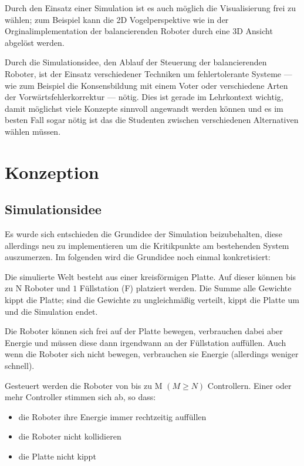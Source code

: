 Durch den Einsatz einer Simulation ist es auch m{\"{o}}glich die Visualisierung frei zu w{\"{a}}hlen; zum Beispiel kann die 2D
Vogelperspektive wie in der Orginalimplementation der balancierenden Roboter durch eine 3D Ansicht abgel{\"{o}}st werden.

Durch die Simulationsidee, den Ablauf der Steuerung der balancierenden Roboter, ist der Einsatz verschiedener Techniken um
fehlertolerante Systeme --- wie zum Beispiel die Konsensbildung mit einem Voter oder verschiedene Arten der Vorw{\"{a}}rtsfehlerkorrektur ---
n{\"{o}}tig. Dies ist gerade im Lehrkontext wichtig, damit m{\"{o}}glichst viele Konzepte sinnvoll angewandt werden
k{\"{o}}nnen und es im besten Fall sogar n{\"{o}}tig ist das die Studenten zwischen verschiedenen Alternativen w{\"{a}}hlen
m{\"{u}}ssen.

\clearpage
\section{Konzeption}
\subsection{Simulationsidee}
Es wurde sich entschieden die Grundidee der Simulation beizubehalten, diese allerdings neu zu implementieren um die Kritikpunkte am
bestehenden System auszumerzen. Im folgenden wird die Grundidee noch einmal konkretisiert:

Die simulierte Welt besteht aus einer kreisf{\"{o}}rmigen Platte. Auf dieser k{\"{o}}nnen bis zu \gls{N}
Roboter und $1$ F{\"{u}}llstation (\gls{F}) platziert werden. Die Summe alle Gewichte kippt die Platte;
sind die Gewichte zu ungleichm{\"{a}}{\ss}ig verteilt, kippt die Platte um und die Simulation endet.

Die Roboter k{\"{o}}nnen sich frei auf der Platte bewegen, verbrauchen dabei aber Energie und m{\"{u}}ssen diese dann irgendwann
an der F{\"{u}}llstation auff{\"{u}}llen. Auch wenn die Roboter sich nicht bewegen, verbrauchen sie Energie (allerdings weniger
schnell).

Gesteuert werden die Roboter von bis zu \gls{M} $(M \geq N)$ Controllern. Einer oder mehr Controller stimmen sich ab,
so dass:
\begin{itemize}
\item die Roboter ihre Energie immer rechtzeitig auff{\"{u}}llen
\item die Roboter nicht kollidieren
\item die Platte nicht kippt
\end{itemize}

